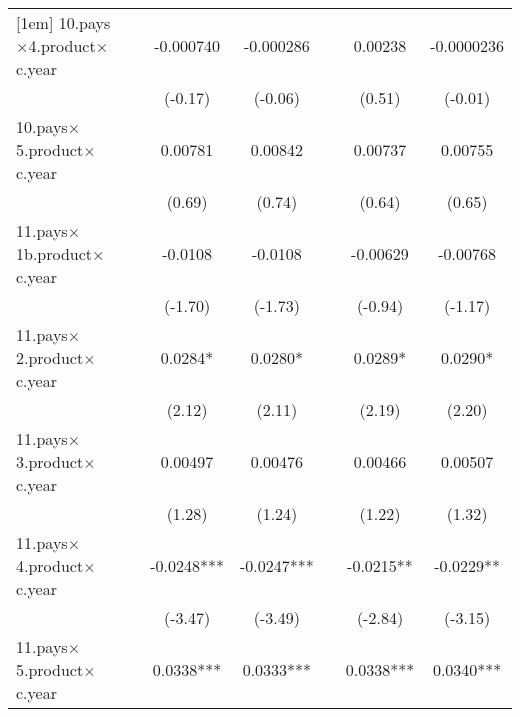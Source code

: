 {\begin{tabular}{l*{6}{c}}
[1em]
10.pays$\times$4.product$\times$c.year&                     &   -0.000740         &   -0.000286         &                     &     0.00238         &  -0.0000236         \\
                    &                     &     (-0.17)         &     (-0.06)         &                     &      (0.51)         &     (-0.01)         \\
[1em]
10.pays$\times$5.product$\times$c.year&                     &     0.00781         &     0.00842         &                     &     0.00737         &     0.00755         \\
                    &                     &      (0.69)         &      (0.74)         &                     &      (0.64)         &      (0.65)         \\
[1em]
11.pays$\times$1b.product$\times$c.year&                     &     -0.0108         &     -0.0108         &                     &    -0.00629         &    -0.00768         \\
                    &                     &     (-1.70)         &     (-1.73)         &                     &     (-0.94)         &     (-1.17)         \\
[1em]
11.pays$\times$2.product$\times$c.year&                     &      0.0284*  &      0.0280*  &                     &      0.0289*  &      0.0290*  \\
                    &                     &      (2.12)         &      (2.11)         &                     &      (2.19)         &      (2.20)         \\
[1em]
11.pays$\times$3.product$\times$c.year&                     &     0.00497         &     0.00476         &                     &     0.00466         &     0.00507         \\
                    &                     &      (1.28)         &      (1.24)         &                     &      (1.22)         &      (1.32)         \\
[1em]
11.pays$\times$4.product$\times$c.year&                     &     -0.0248***&     -0.0247***&                     &     -0.0215** &     -0.0229** \\
                    &                     &     (-3.47)         &     (-3.49)         &                     &     (-2.84)         &     (-3.15)         \\
[1em]
11.pays$\times$5.product$\times$c.year&                     &      0.0338***&      0.0333***&                     &      0.0338***&      0.0340***\\

\end{tabular}}
